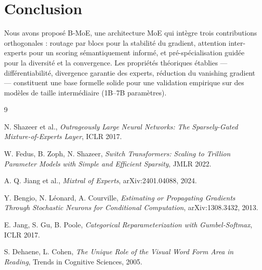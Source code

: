 \documentclass[10pt,a4paper]{article}
\begin{document}
\section{Conclusion}

Nous avons proposé B-MoE, une architecture MoE qui intègre trois contributions orthogonales : routage par blocs pour la stabilité du gradient, attention inter-experts pour un scoring sémantiquement informé, et pré-spécialisation guidée pour la diversité et la convergence. Les propriétés théoriques établies — différentiabilité, divergence garantie des experts, réduction du vanishing gradient — constituent une base formelle solide pour une validation empirique sur des modèles de taille intermédiaire (1B–7B paramètres).


\begin{thebibliography}{9}

N. Shazeer et al., \textit{Outrageously Large Neural Networks: The Sparsely-Gated Mixture-of-Experts Layer}, ICLR 2017.

W. Fedus, B. Zoph, N. Shazeer, \textit{Switch Transformers: Scaling to Trillion Parameter Models with Simple and Efficient Sparsity}, JMLR 2022.

A. Q. Jiang et al., \textit{Mixtral of Experts}, arXiv:2401.04088, 2024.

Y. Bengio, N. Léonard, A. Courville, \textit{Estimating or Propagating Gradients Through Stochastic Neurons for Conditional Computation}, arXiv:1308.3432, 2013.

E. Jang, S. Gu, B. Poole, \textit{Categorical Reparameterization with Gumbel-Softmax}, ICLR 2017.

S. Dehaene, L. Cohen, \textit{The Unique Role of the Visual Word Form Area in Reading}, Trends in Cognitive Sciences, 2005.

\end{thebibliography}
\end{document}
